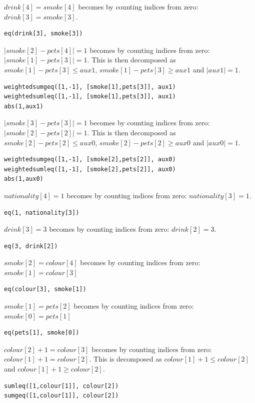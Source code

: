 \documentclass[oneside]{book}
\begin{document}
$drink[4] = smoke[4]$ becomes by counting indices from zero: $drink[3] = smoke[3]$.
\begin{verbatim}
eq(drink[3], smoke[3])
\end{verbatim} 

$|smoke[2] - pets[4]| = 1$ becomes by counting indices from zero: $|smoke[1] - pets[3]| = 1$. This is then decomposed as $smoke[1] - pets[3] \leq aux1$, $smoke[1] - pets[3] \geq aux1$ and $|aux1|=1$.
\begin{verbatim}
weightedsumgeq([1,-1], [smoke[1],pets[3]], aux1)
weightedsumleq([1,-1], [smoke[1],pets[3]], aux1)
abs(1,aux1)
\end{verbatim}

$|smoke[3] - pets[3]| = 1$ becomes by counting indices from zero: $|smoke[2] - pets[2]| = 1$. This is then decomposed as $smoke[2] - pets[2] \leq aux0$, $smoke[2] - pets[2] \geq aux0$ and $|aux0|=1$.
\begin{verbatim}
weightedsumgeq([1,-1], [smoke[2],pets[2]], aux0)
weightedsumleq([1,-1], [smoke[2],pets[2]], aux0)
abs(1,aux0)
\end{verbatim}

$nationality[4] = 1$ becomes by counting indices from zero: $nationality[3] = 1$.
\begin{verbatim}
eq(1, nationality[3])
\end{verbatim}

$drink[3] = 3$ becomes by counting indices from zero: $drink[2] = 3$.
\begin{verbatim}
eq(3, drink[2])
\end{verbatim}

$smoke[2] = colour[4]$ becomes by counting indices from zero: $smoke[1] = colour[3]$
\begin{verbatim}
eq(colour[3], smoke[1])
\end{verbatim}

$smoke[1] = pets[2]$ becomes by counting indices from zero: $smoke[0] = pets[1]$
\begin{verbatim}
eq(pets[1], smoke[0])
\end{verbatim}

$colour[2] + 1 = colour[3]$ becomes by counting indices from zero: $colour[1] + 1 = colour[2]$. This is decomposed as $colour[1] + 1 \leq colour[2]$ and $colour[1] + 1 \geq colour[2]$. 
\begin{verbatim}
sumleq([1,colour[1]], colour[2])
sumgeq([1,colour[1]], colour[2])
\end{verbatim}
\end{document}
